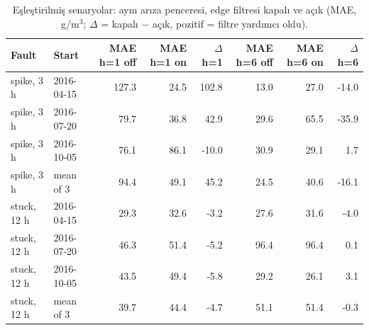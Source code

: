 \begin{table}[t]
\caption{Eşleştirilmiş senaryolar: aynı arıza penceresi, edge filtresi kapalı ve açık (MAE, \textmu g/m$^3$; $\Delta$ = kapalı − açık, pozitif = filtre yardımcı oldu).}
\label{tab:scenarios_ab}
\centering\footnotesize
\begin{tabular}{llrrrrrr}
\toprule
Fault & Start & MAE h=1 off & MAE h=1 on & $\Delta$ h=1 & MAE h=6 off & MAE h=6 on & $\Delta$ h=6 \\
\midrule
spike, 3 h & 2016-04-15 & 127.3 & 24.5 & 102.8 & 13.0 & 27.0 & -14.0 \\
spike, 3 h & 2016-07-20 & 79.7 & 36.8 & 42.9 & 29.6 & 65.5 & -35.9 \\
spike, 3 h & 2016-10-05 & 76.1 & 86.1 & -10.0 & 30.9 & 29.1 & 1.7 \\
spike, 3 h & mean of 3 & 94.4 & 49.1 & 45.2 & 24.5 & 40.6 & -16.1 \\
stuck, 12 h & 2016-04-15 & 29.3 & 32.6 & -3.2 & 27.6 & 31.6 & -4.0 \\
stuck, 12 h & 2016-07-20 & 46.3 & 51.4 & -5.2 & 96.4 & 96.4 & 0.1 \\
stuck, 12 h & 2016-10-05 & 43.5 & 49.4 & -5.8 & 29.2 & 26.1 & 3.1 \\
stuck, 12 h & mean of 3 & 39.7 & 44.4 & -4.7 & 51.1 & 51.4 & -0.3 \\
\bottomrule
\end{tabular}
\end{table}
